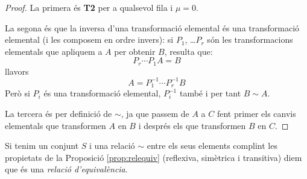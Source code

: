 \begin{proof}
	La primera és \textbf{T2} per a qualsevol fila i $\mu=0$. 
	
	La segona és que la inversa d'una transformació elemental és una transformació elemental (i les composem en ordre invers): si $P_1$, \dots $P_r$ són les transformacions elementals que apliquem a $A$ per obtenir $B$, resulta que:
	$$
	P_r \cdots P_1 A=B
	$$
	llavors
	$$
	A= P_1^{-1} \cdots P_r^{-1} B
	$$
	Però si $P_i$ és una transformació elemental, $P_i^{-1}$ també i per tant $B\sim A$.
	
	La tercera és per definició de $\sim$, ja que passem de $A$ a $C$ fent primer els canvis elementals que transformen $A$ en $B$ i després els que transformen $B$ en $C$.
\end{proof}

\begin{observacio}
	Si tenim un conjunt $S$ i una relació $\sim$ entre els seus elements complint les propietats de la Proposició \ref{prop:relequiv} (reflexiva, simètrica i transitiva) diem que és una \emph{relació d'equivalència}.
\end{observacio}


